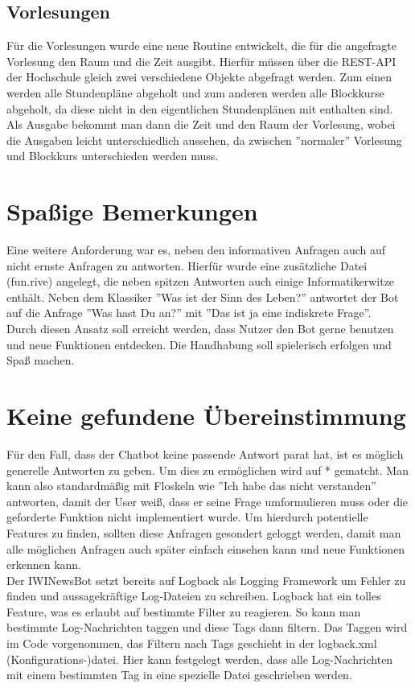 
\subsection{Vorlesungen}
Für die Vorlesungen wurde eine neue Routine entwickelt, die für die angefragte Vorlesung den Raum und die Zeit ausgibt. Hierfür müssen über die REST-API der Hochschule gleich zwei verschiedene Objekte abgefragt werden. Zum einen werden alle Stundenpläne abgeholt und zum anderen werden alle Blockkurse abgeholt, da diese nicht in den eigentlichen Stundenplänen mit enthalten sind. Als Ausgabe bekommt man dann die Zeit und den Raum der Vorlesung, wobei die Ausgaben leicht unterschiedlich aussehen, da zwischen ''normaler'' Vorlesung und Blockkurs unterschieden werden muss.


\section{Spaßige Bemerkungen}
Eine weitere Anforderung war es, neben den informativen Anfragen auch auf nicht ernste Anfragen zu antworten. Hierfür wurde eine zusätzliche Datei (fun.rive) angelegt, die neben spitzen Antworten auch einige Informatikerwitze enthält. Neben dem Klassiker ''Was ist der Sinn des Leben?'' antwortet der Bot auf die Anfrage ''Was hast Du an?'' mit ''Das ist ja eine indiskrete Frage''. \\
Durch diesen Ansatz soll erreicht werden, dass Nutzer den Bot gerne benutzen und neue Funktionen entdecken. Die Handhabung soll spielerisch erfolgen und Spaß machen.

\section{Keine gefundene Übereinstimmung}
Für den Fall, dass der Chatbot keine passende Antwort parat hat, ist es möglich generelle Antworten zu geben. Um dies zu ermöglichen wird auf * gematcht. Man kann also standardmäßig mit Floskeln wie ''Ich habe das nicht verstanden'' antworten, damit der User weiß, dass er seine Frage umformulieren muss oder die geforderte Funktion nicht implementiert wurde. Um hierdurch potentielle Features zu finden, sollten diese Anfragen gesondert geloggt werden, damit man alle möglichen Anfragen auch später einfach einsehen kann und neue Funktionen erkennen kann. \\
Der IWINewsBot setzt bereits auf Logback als Logging Framework um Fehler zu finden und aussagekräftige Log-Dateien zu schreiben. Logback hat ein tolles Feature, was es erlaubt auf bestimmte Filter zu reagieren. So kann man bestimmte Log-Nachrichten taggen und diese Tags dann filtern. Das Taggen wird im Code vorgenommen, das Filtern nach Tags geschieht in der logback.xml (Konfigurations-)datei. Hier kann festgelegt werden, dass alle Log-Nachrichten mit einem bestimmten Tag in eine spezielle Datei geschrieben werden.


